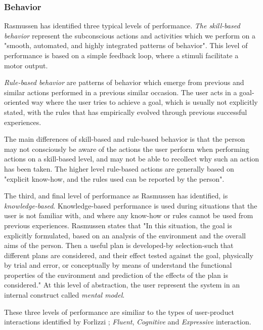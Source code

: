 \subsubsection{Behavior}
Rasmussen \cite{Rasmussen1983} has identified three typical levels of performance. \textit{The skill-based behavior} represent the subconscious actions and activities which we perform on a "smooth, automated, and highly integrated patterns of behavior". This level of performance is based on a simple feedback loop, where a stimuli facilitate a motor output. 

\textit{Rule-based behavior} are patterns of behavior which emerge from previous and similar actions performed in a previous similar occasion. The user acts in a goal-oriented way where the user tries to achieve a goal, which is usually not explicitly stated, with the rules that has empirically evolved through previous successful experiences.

The main differences of skill-based and rule-based behavior is that the person may not consciously be aware of the actions the user perform when performing actions on a skill-based level, and may not be able to recollect why such an action has been taken. The higher level rule-based actions are generally based on "explicit know-how, and the rules used can be reported by the person".

The third, and final level of performance as Rasmussen \cite{Rasmussen1983} has identified, is \textit{knowledge-based}. Knowledge-based performance is used during situations that the user is not familiar with, and where any know-how or rules cannot be used from previous experiences. Rasmussen \cite{Rasmussen1983} states that "In this situation, the goal is explicitly formulated, based on an analysis of the environment and the overall aims of the person. Then a useful plan is developed-by selection-such that different plans are considered, and their effect tested against the goal, physically by trial and error, or conceptually by means of understand the functional properties of the environment and prediction of the effects of the plan is considered." At this level of abstraction, the user represent the system in an internal construct called \textit{mental model}.

These three levels of performance are similiar to the types of user-product interactions identified by Forlizzi \cite{Forlizzi2004}; \textit{Fluent}, \textit{Cognitive} and \textit{Expressive} interaction.

